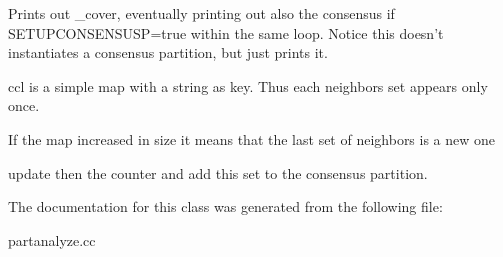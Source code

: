 Prints out \_\-cover, eventually printing out also the consensus if SETUPCONSENSUSP=true within the same loop. Notice this doesn't instantiates a consensus partition, but just prints it. 

ccl is a simple map with a string as key. Thus each neighbors set appears only once.

If the map increased in size it means that the last set of neighbors is a new one

update then the counter and add this set to the consensus partition. 

The documentation for this class was generated from the following file:\begin{CompactItemize}
\item 
partanalyze.cc\end{CompactItemize}
